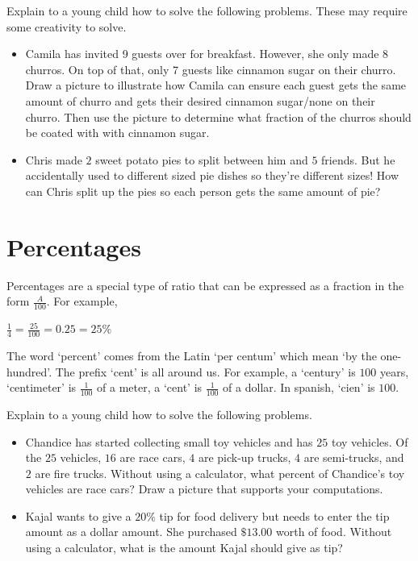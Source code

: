\documentclass{ximera}
\begin{document}
\begin{exploration}
Explain to a young child how to solve the following problems. These may require some creativity to solve.
\begin{itemize}
\item Camila has invited 9 guests over for breakfast. However, she only made 8 churros. On top of that, only 7 guests like cinnamon sugar on their churro.  Draw a picture to illustrate how Camila can ensure each guest gets the same amount of churro and gets their desired cinnamon sugar/none on their churro. Then use the picture to determine what fraction of the churros should be coated with with cinnamon sugar.
\item Chris made $2$ sweet potato pies to split between him and $5$ friends. But he accidentally used to different sized pie dishes so they're different sizes! How can Chris split up the pies so each person gets the same amount of pie?
\end{itemize}
\end{exploration}

\section{Percentages}
Percentages are a special type of ratio that can be expressed as a fraction in the form $\frac{A}{100}$.  For example,
\begin{center} $\frac{1}{4} = \frac{25}{100} = 0.25=25\%$ \end{center}

The word `percent' comes from the Latin `per centum' which mean `by the one-hundred'. The prefix `cent' is all around us. For example, a `century' is $100$ years, `centimeter' is $\frac{1}{100}$ of a meter, a `cent' is $\frac{1}{100}$ of a dollar. In spanish, `cien' is $100$. \\



\begin{exploration}
Explain to a young child how to solve the following problems.
\begin{itemize} 
\item Chandice has started collecting small toy vehicles and has $25$ toy vehicles. Of the $25$ vehicles, $16$ are race cars, $4$ are pick-up trucks, $4$ are semi-trucks, and $2$ are fire trucks.  Without using a calculator, what percent of Chandice's toy vehicles are race cars? Draw a picture that supports your computations.
\item Kajal wants to give a $20\%$ tip for food delivery but needs to enter the tip amount as a dollar amount. She purchased $\$13.00$ worth of food. Without using a calculator, what is the amount Kajal should give as tip?
\end{itemize}
\end{exploration} 
\end{document}
